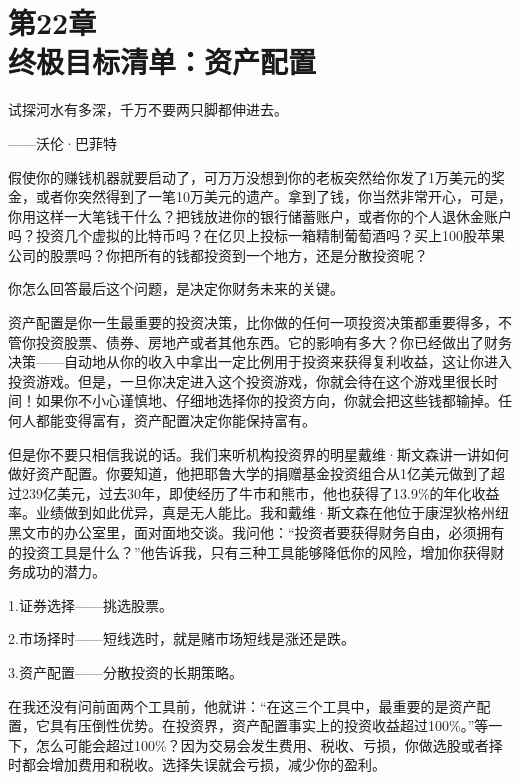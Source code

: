 
\section[第22章\q 终极目标清单：资产配置]{第22章\\ 终极目标清单：资产配置}

\begin{BookQuote}
试探河水有多深，千万不要两只脚都伸进去。

\hfill ——沃伦·巴菲特
\end{BookQuote}

假使你的赚钱机器就要启动了，可万万没想到你的老板突然给你发了1万美元的奖金，或者你突然得到了一笔10万美元的遗产。拿到了钱，你当然非常开心，可是，你用这样一大笔钱干什么？把钱放进你的银行储蓄账户，或者你的个人退休金账户吗？投资几个虚拟的比特币吗？在亿贝上投标一箱精制葡萄酒吗？买上100股苹果公司的股票吗？你把所有的钱都投资到一个地方，还是分散投资呢？

你怎么回答最后这个问题，是决定你财务未来的关键。

资产配置是你一生最重要的投资决策，比你做的任何一项投资决策都重要得多，不管你投资股票、债券、房地产或者其他东西。它的影响有多大？你已经做出了财务决策——自动地从你的收入中拿出一定比例用于投资来获得复利收益，这让你进入投资游戏。但是，一旦你决定进入这个投资游戏，你就会待在这个游戏里很长时间！如果你不小心谨慎地、仔细地选择你的投资方向，你就会把这些钱都输掉。任何人都能变得富有，资产配置决定你能保持富有。

但是你不要只相信我说的话。我们来听机构投资界的明星戴维·斯文森讲一讲如何做好资产配置。你要知道，他把耶鲁大学的捐赠基金投资组合从1亿美元做到了超过239亿美元，过去30年，即使经历了牛市和熊市，他也获得了13.9\%的年化收益率。业绩做到如此优异，真是无人能比。我和戴维·斯文森在他位于康涅狄格州纽黑文市的办公室里，面对面地交谈。我问他：“投资者要获得财务自由，必须拥有的投资工具是什么？”他告诉我，只有三种工具能够降低你的风险，增加你获得财务成功的潜力。

1.证券选择——挑选股票。

2.市场择时——短线选时，就是赌市场短线是涨还是跌。

3.资产配置——分散投资的长期策略。

在我还没有问前面两个工具前，他就讲：“在这三个工具中，最重要的是资产配置，它具有压倒性优势。在投资界，资产配置事实上的投资收益超过100\%。”等一下，怎么可能会超过100\%？因为交易会发生费用、税收、亏损，你做选股或者择时都会增加费用和税收。选择失误就会亏损，减少你的盈利。

